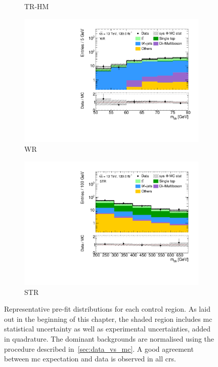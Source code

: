 \begin{figure}
\begin{subfigure}[b]{0.5\linewidth}
		\caption{TR-HM\label{fig:prefit_TRHM}}
	\end{subfigure}\hfill
	\begin{subfigure}[b]{0.5\linewidth}
		\centering\includegraphics[width=1.0\textwidth]{1Lbb_WR_mbb}
		\caption{WR\label{fig:prefit_WR}}
	\end{subfigure}\hfill
	\begin{subfigure}[b]{0.5\linewidth}
		\centering\includegraphics[width=1.0\textwidth]{1Lbb_STR_mbb}
		\caption{STR\label{fig:prefit_STCR}}
	\end{subfigure}\hfill

	\caption{Representative pre-fit distributions for each control region. As laid out in the beginning of this chapter, the shaded region includes \gls{mc} statistical uncertainty as well as experimental uncertainties, added in quadrature. The dominant backgrounds are normalised using the procedure described in~\cref{sec:data_vs_mc}. A good agreement between \gls{mc} expectation and data is observed in all \glspl{cr}.}
	\label{fig:CR_distributions_prefit}
\end{figure}

